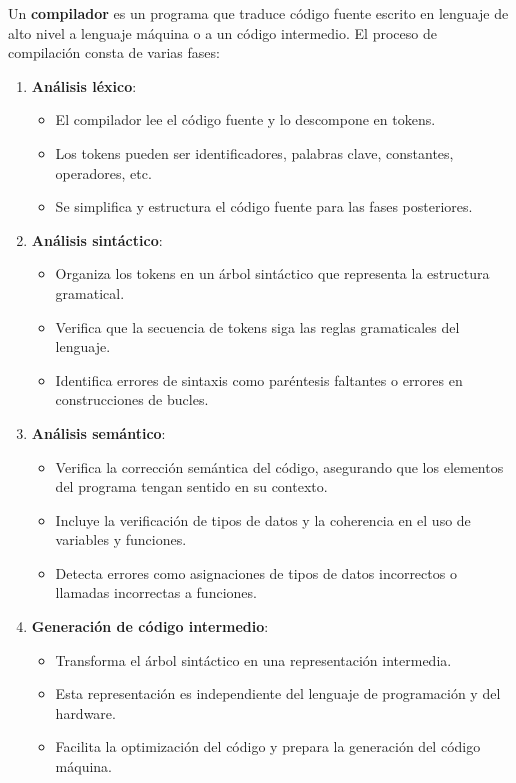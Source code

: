 Un \textbf{compilador} es un programa que traduce código fuente escrito en lenguaje de alto nivel a lenguaje máquina o a un código intermedio. El proceso de compilación consta de varias fases:

\begin{enumerate}
    \item \textbf{Análisis léxico}: 
        \begin{itemize}
            \item El compilador lee el código fuente y lo descompone en tokens.
            \item Los tokens pueden ser identificadores, palabras clave, constantes, operadores, etc.
            \item Se simplifica y estructura el código fuente para las fases posteriores.
        \end{itemize}

    \item \textbf{Análisis sintáctico}:
        \begin{itemize}
            \item Organiza los tokens en un árbol sintáctico que representa la estructura gramatical.
            \item Verifica que la secuencia de tokens siga las reglas gramaticales del lenguaje.
            \item Identifica errores de sintaxis como paréntesis faltantes o errores en construcciones de bucles.
        \end{itemize}

    \item \textbf{Análisis semántico}:
        \begin{itemize}
            \item Verifica la corrección semántica del código, asegurando que los elementos del programa tengan sentido en su contexto.
            \item Incluye la verificación de tipos de datos y la coherencia en el uso de variables y funciones.
            \item Detecta errores como asignaciones de tipos de datos incorrectos o llamadas incorrectas a funciones.
        \end{itemize}

    \item \textbf{Generación de código intermedio}:
        \begin{itemize}
            \item Transforma el árbol sintáctico en una representación intermedia.
            \item Esta representación es independiente del lenguaje de programación y del hardware.
            \item Facilita la optimización del código y prepara la generación del código máquina.
        \end{itemize}


\end{enumerate}
